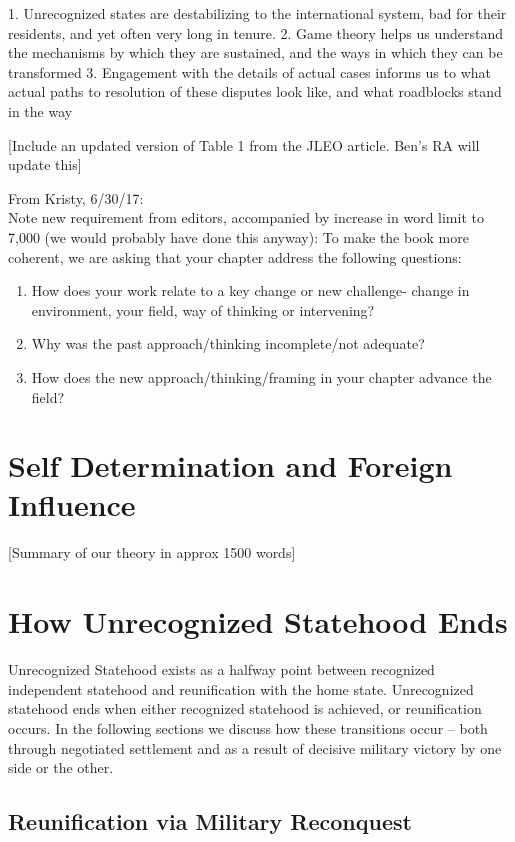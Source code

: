 \documentclass[12pt,letterpaper, notitlepage]{article}
\begin{document}
1. Unrecognized states are destabilizing to the international system, bad for their residents, and yet often very long in tenure.
2. Game theory helps us understand the mechanisms by which they are sustained, and the ways in which they can be transformed
3. Engagement with the details of actual cases informs us to what actual paths to resolution of these disputes look like, and what roadblocks stand in the way


[Include an updated version of Table 1 from the JLEO article. Ben's RA will update this]

From Kristy, 6/30/17:\\
Note new requirement from editors, accompanied by increase in word limit to 7,000 (we would probably have done this anyway):
To make the book  more coherent, we are asking that your chapter address the following questions:
\begin{enumerate}
	\item How does your work relate to a key change or  new challenge- change in environment, your field, way of thinking or intervening?
	\item Why was the past approach/thinking incomplete/not adequate?
	\item How does the new approach/thinking/framing in your chapter advance the field?
\end{enumerate} 



\section*{Self Determination and Foreign Influence}

[Summary of our theory in approx 1500 words]



\section*{How Unrecognized Statehood Ends}

Unrecognized Statehood exists as a halfway point between recognized independent statehood and reunification with the home state. Unrecognized statehood ends when either recognized statehood is achieved, or reunification occurs.  In the following sections we discuss how these transitions occur -- both through negotiated settlement and as a result of decisive military victory by one side or the other.  

\subsection*{Reunification via Military Reconquest}
\end{document}
